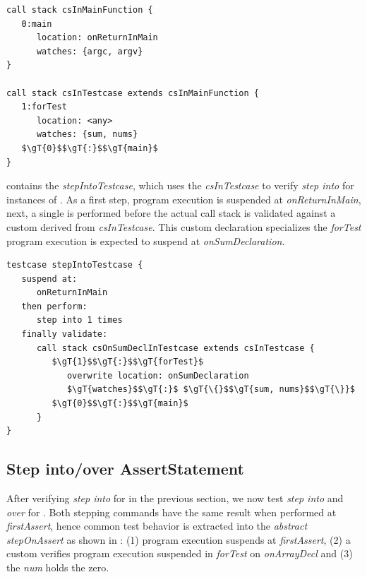 \begin{lstlisting}[language=testingDSL,caption=\ic{CallStack} declarations,
label=lst:callStacks]
call stack csInMainFunction {
   0:main
      location: onReturnInMain
      watches: {argc, argv}                     
}

call stack csInTestcase extends csInMainFunction {
   1:forTest
      location: <any>
      watches: {sum, nums}                  
   $\gT{0}$$\gT{:}$$\gT{main}$
}
\end{lstlisting}

 contains the 
\emph{stepIntoTestcase}, which uses the  \emph{csInTestcase}
to verify \emph{step into} for instances of . As
a first step, program execution is suspended at \emph{onReturnInMain}, next, a
single  is performed before the actual call stack is validated against
a custom  derived from \emph{csInTestcase}.
This custom declaration specializes the 
\emph{forTest} \ie program execution is expected to suspend at
\emph{onSumDeclaration}.

\begin{lstlisting}[language=testingDSL,label=lst:stepIntoTestcase,
caption=\emph{Step into} \ic{ExecuteTestExpression}]
testcase stepIntoTestcase {            
   suspend at: 
      onReturnInMain
   then perform:                         
      step into 1 times    
   finally validate:                         
      call stack csOnSumDeclInTestcase extends csInTestcase {
         $\gT{1}$$\gT{:}$$\gT{forTest}$
            overwrite location: onSumDeclaration
            $\gT{watches}$$\gT{:}$ $\gT{\{}$$\gT{sum, nums}$$\gT{\}}$
         $\gT{0}$$\gT{:}$$\gT{main}$                       
      }
}
\end{lstlisting}
\vspace{-1mm}
\subsection{Step into/over AssertStatement}

After verifying \emph{step into} for
 in the previous section, we now test \emph{step into}
and \emph{over} for . Both stepping commands have 
the same result when performed at
\emph{firstAssert}, hence common test behavior is extracted into the
\emph{abstract}  \emph{stepOnAssert} as shown in
: (1) program
execution suspends at \emph{firstAssert}, (2) a custom  verifies 
program execution suspended in \emph{forTest} on \emph{onArrayDecl} and
(3) the  \emph{num} holds the  zero.
 
